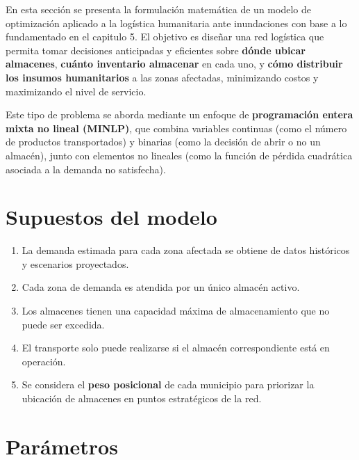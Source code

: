 \documentclass[
  spanish,
  us-letterpaper,
]{scrreprt}
\providecommand{\tightlist}{%
  \setlength{\itemsep}{0pt}\setlength{\parskip}{0pt}}
\numberwithin{equation}{section}
\begin{document}
En esta sección se presenta la formulación matemática de un modelo de
optimización aplicado a la logística humanitaria ante inundaciones con
base a lo fundamentado en el capitulo 5. El objetivo es diseñar una red
logística que permita tomar decisiones anticipadas y eficientes sobre
\textbf{dónde ubicar almacenes}, \textbf{cuánto inventario almacenar} en
cada uno, y \textbf{cómo distribuir los insumos humanitarios} a las
zonas afectadas, minimizando costos y maximizando el nivel de servicio.

Este tipo de problema se aborda mediante un enfoque de
\textbf{programación entera mixta no lineal (MINLP)}, que combina
variables continuas (como el número de productos transportados) y
binarias (como la decisión de abrir o no un almacén), junto con
elementos no lineales (como la función de pérdida cuadrática asociada a
la demanda no satisfecha).

\section{Supuestos del modelo}\label{supuestos-del-modelo}

\begin{enumerate}
\def\labelenumi{\arabic{enumi}.}
\tightlist
\item
  La demanda estimada para cada zona afectada se obtiene de datos
  históricos y escenarios proyectados.\\
\item
  Cada zona de demanda es atendida por un único almacén activo.\\
\item
  Los almacenes tienen una capacidad máxima de almacenamiento que no
  puede ser excedida.\\
\item
  El transporte solo puede realizarse si el almacén correspondiente está
  en operación.\\
\item
  Se considera el \textbf{peso posicional} de cada municipio para
  priorizar la ubicación de almacenes en puntos estratégicos de la red.
\end{enumerate}

\section{Parámetros}\label{paruxe1metros}
\end{document}
